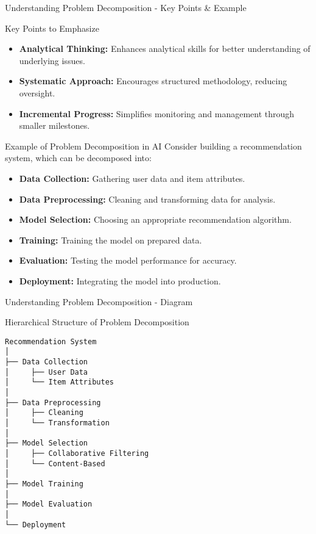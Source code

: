 \documentclass[aspectratio=169]{beamer}
\begin{document}
\begin{frame}[fragile]{Understanding Problem Decomposition - Key Points & Example}
    \begin{block}{Key Points to Emphasize}
        \begin{itemize}
            \item \textbf{Analytical Thinking:} Enhances analytical skills for better understanding of underlying issues.
            \item \textbf{Systematic Approach:} Encourages structured methodology, reducing oversight.
            \item \textbf{Incremental Progress:} Simplifies monitoring and management through smaller milestones.
        \end{itemize}
    \end{block}

    \begin{block}{Example of Problem Decomposition in AI}
        Consider building a recommendation system, which can be decomposed into:
        \begin{itemize}
            \item \textbf{Data Collection:} Gathering user data and item attributes.
            \item \textbf{Data Preprocessing:} Cleaning and transforming data for analysis.
            \item \textbf{Model Selection:} Choosing an appropriate recommendation algorithm.
            \item \textbf{Training:} Training the model on prepared data.
            \item \textbf{Evaluation:} Testing the model performance for accuracy.
            \item \textbf{Deployment:} Integrating the model into production.
        \end{itemize}
    \end{block}
\end{frame}

\begin{frame}[fragile]{Understanding Problem Decomposition - Diagram}
    \begin{block}{Hierarchical Structure of Problem Decomposition}
        \begin{verbatim}
Recommendation System
│
├── Data Collection
│     ├── User Data
│     └── Item Attributes
│
├── Data Preprocessing
│     ├── Cleaning
│     └── Transformation
│
├── Model Selection
│     ├── Collaborative Filtering
│     └── Content-Based
│
├── Model Training
│
├── Model Evaluation
│
└── Deployment
        \end{verbatim}
    \end{block}
\end{frame}
\end{document}
